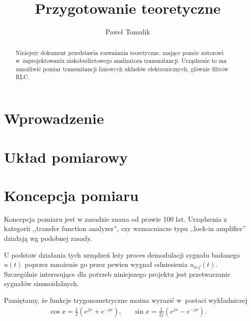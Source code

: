 \documentclass[paper=a4,DIV=12]{tfa}
\begin{document}
\title{Przygotowanie teoretyczne}
\author{Paweł Tomulik}
\date{}
\maketitle

\begin{abstract}
  Niniejszy dokument przedstawia rozważania teoretyczne, mające pomóc autorowi
  w~zaprojektowaniu niskobudżetowego analizatora transmitancji. Urządzenie to
  ma umożliwić pomiar transmitancji liniowych układów elektronicznych, głównie
  filtrów RLC.
\end{abstract}

\section{Wprowadzenie}
\label{sec:G1J9K}

\section{Układ pomiarowy}
\label{sec:NMQFB}

\section{Koncepcja pomiaru}
\label{sec:6C4QN}

Koncepcja pomiaru jest w zasadzie znana od prawie 100 lat. Urządzenia z
kategorii ,,transfer function analyzer'', czy wzmacniacze typu ,,lock-in
amplifier'' działają wg podobnej zasady.

U podstaw działania tych urządzeń leży proces demodulacji sygnału badanego
$u(t)$ poprzez mnożenie go przez pewien wygnał odniesienia $u_{ref}(t)$.
Szczególnie interesujące dla potrzeb niniejszego projektu jest przetwarzanie
sygnałów sinusoidalnych.

Pamiętamy, że funkcje trygonometryczne można wyrazić w~postaci wykładniczej
\begin{align}
  & \cos x = \frac{1}{2} \left( e^{jx} + e^{-jx}\right), &
  & \sin x = \frac{1}{2j} \left( e^{jx} - e^{-jx}\right). &
  \label{eq:7R2OT}
\end{align}
\end{document}
